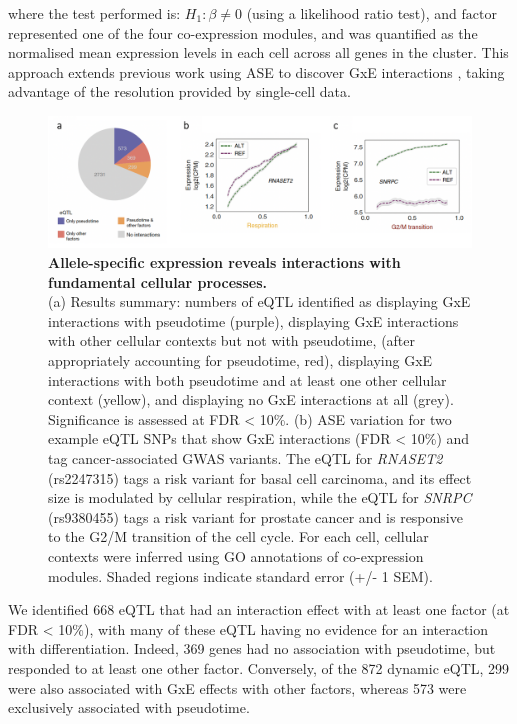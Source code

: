where the test performed is: $H_1: \beta \neq 0$ (using a likelihood ratio test), and $\mathrm{factor}$ represented one of the four co-expression modules, and was quantified as the normalised mean expression levels in each cell across all genes in the cluster.
This approach extends previous work using ASE to discover GxE interactions \cite{knowles2017allele, moyerbrailean2016high}, taking advantage of the resolution provided by single-cell data. \\

\begin{figure}[h]
\centering
\includegraphics[width=15.5cm]{Chapter4/Fig/endodiff_GxE.png}
\caption[Allele-specific expression reveals interactions with fundamental cellular processes]{\textbf{Allele-specific expression reveals interactions with fundamental cellular processes.}\\
(a) Results summary: numbers of eQTL identified as displaying GxE interactions with pseudotime (purple), displaying GxE interactions with other cellular contexts but not with pseudotime, (after appropriately accounting for pseudotime, red), displaying GxE interactions with both pseudotime and at least one other cellular context (yellow), and displaying no GxE interactions at all (grey). 
Significance is assessed at FDR < 10\%.
(b) ASE variation for two example eQTL SNPs that show GxE interactions (FDR < 10\%) and tag cancer-associated GWAS variants. 
The eQTL for \textit{RNASET2} (rs2247315) tags a risk variant for basal cell carcinoma, and its effect size is modulated by cellular respiration, while the eQTL for \textit{SNRPC} (rs9380455) tags a risk variant for prostate cancer and is responsive to the G2/M transition of the cell cycle. 
For each cell, cellular contexts were inferred using GO annotations of co-expression modules. 
Shaded regions indicate standard error (+/- 1 SEM).}
\label{fig:endodiff_gxe}
\end{figure}

We identified 668 eQTL that had an interaction effect with at least one factor (at FDR < 10\%), with many of these eQTL having no evidence for an interaction with differentiation.
Indeed, 369 genes had no association with pseudotime, but responded to at least one other factor. 
Conversely, of the 872 dynamic eQTL, 299 were also associated with GxE effects with other factors, whereas 573 were exclusively associated with pseudotime.\\

